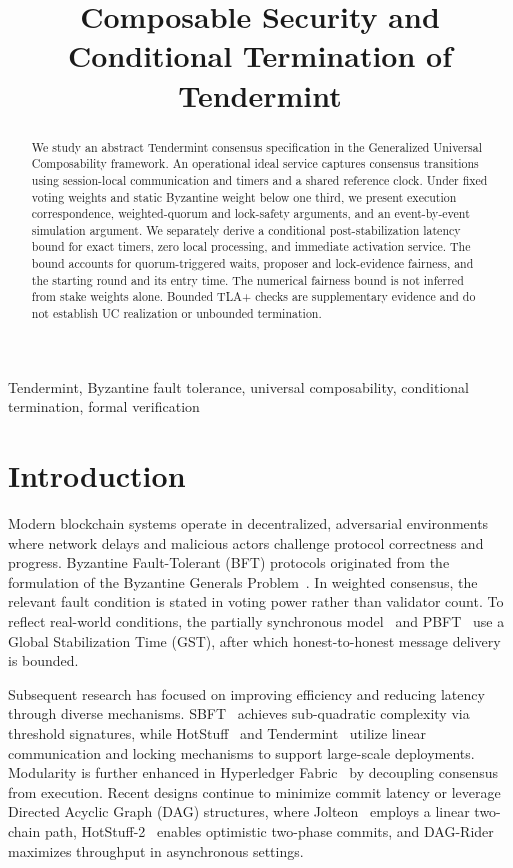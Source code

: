 \documentclass[conference,letterpaper,10pt]{IEEEtran}
\begin{document}
\title{Composable Security and Conditional Termination of Tendermint}
\author{}
\maketitle

\begin{abstract}
We study an abstract Tendermint consensus specification in the Generalized Universal Composability framework. An operational ideal service captures consensus transitions using session-local communication and timers and a shared reference clock. Under fixed voting weights and static Byzantine weight below one third, we present execution correspondence, weighted-quorum and lock-safety arguments, and an event-by-event simulation argument. We separately derive a conditional post-stabilization latency bound for exact timers, zero local processing, and immediate activation service. The bound accounts for quorum-triggered waits, proposer and lock-evidence fairness, and the starting round and its entry time. The numerical fairness bound is not inferred from stake weights alone. Bounded TLA+ checks are supplementary evidence and do not establish UC realization or unbounded termination.
\end{abstract}
\begin{IEEEkeywords}
Tendermint, Byzantine fault tolerance, universal composability, conditional termination, formal verification
\end{IEEEkeywords}

\section{Introduction}\label{sec:introduction}

Modern blockchain systems operate in decentralized, adversarial environments where network delays and malicious actors challenge protocol correctness and progress. Byzantine Fault-Tolerant (BFT) protocols originated from the formulation of the Byzantine Generals Problem~\cite{lamport1982byzantine}. In weighted consensus, the relevant fault condition is stated in voting power rather than validator count. To reflect real-world conditions, the partially synchronous model~\cite{dwork1988consensus} and PBFT~\cite{castro1999practical} use a Global Stabilization Time (GST), after which honest-to-honest message delivery is bounded.

Subsequent research has focused on improving efficiency and reducing latency through diverse mechanisms. SBFT~\cite{gueta2019sbft} achieves sub-quadratic complexity via threshold signatures, while HotStuff~\cite{yin2019hotstuff} and Tendermint~\cite{kwon2014tendermint,buchman2018latest} utilize linear communication and locking mechanisms to support large-scale deployments. Modularity is further enhanced in Hyperledger Fabric~\cite{androulaki2018hyperledger} by decoupling consensus from execution. Recent designs continue to minimize commit latency or leverage Directed Acyclic Graph (DAG) structures, where Jolteon~\cite{gelashvili2022jolteon} employs a linear two-chain path, HotStuff-2~\cite{malkhi2023hotstuff} enables optimistic two-phase commits, and DAG-Rider~\cite{keidar2021all} maximizes throughput in asynchronous settings.
\end{document}
